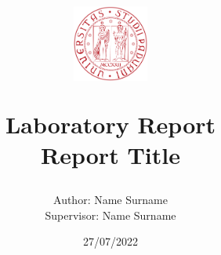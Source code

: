 \documentclass[twocolumn]{article}
\title{
    \vspace{-1cm}
    \includegraphics[height=2.5cm]{images/logo_unipd.png}
    \par
    \vspace{0.5cm}
    \textbf{Laboratory Report}\\
    Report Title
}
\author{
    Author: {Name Surname} \\
    Supervisor: {Name Surname}
}
\date{27/07/2022}
\begin{document}
\pagecolor{blond} %

\maketitle


%
%
%
%
%
\begin{abstract}
       
\end{abstract}










\end{document}
